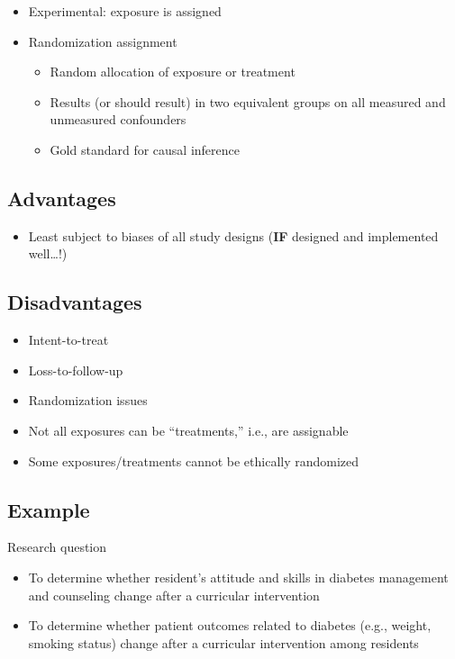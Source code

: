 \documentclass[
]{book}
\providecommand{\tightlist}{%
  \setlength{\itemsep}{0pt}\setlength{\parskip}{0pt}}
\begin{document}
\begin{itemize}
\tightlist
\item
  Experimental: exposure is assigned
\item
  Randomization assignment

  \begin{itemize}
  \tightlist
  \item
    Random allocation of exposure or treatment
  \item
    Results (or should result) in two equivalent groups on all measured and unmeasured confounders
  \item
    Gold standard for causal inference
  \end{itemize}
\end{itemize}

\hypertarget{advantages-3}{%
\subsection{Advantages}\label{advantages-3}}

\begin{itemize}
\tightlist
\item
  Least subject to biases of all study designs (\textbf{IF} designed and implemented well\ldots!)
\end{itemize}

\hypertarget{disadvantages-2}{%
\subsection{Disadvantages}\label{disadvantages-2}}

\begin{itemize}
\tightlist
\item
  Intent-to-treat
\item
  Loss-to-follow-up
\item
  Randomization issues
\item
  Not all exposures can be ``treatments,'' i.e., are assignable
\item
  Some exposures/treatments cannot be ethically randomized
\end{itemize}

\hypertarget{example-3}{%
\subsection{Example}\label{example-3}}

Research question

\begin{itemize}
\tightlist
\item
  To determine whether resident's attitude and skills in diabetes management and counseling change after a curricular intervention
\item
  To determine whether patient outcomes related to diabetes (e.g., weight, smoking status) change after a curricular intervention among residents
\end{itemize}
\end{document}
